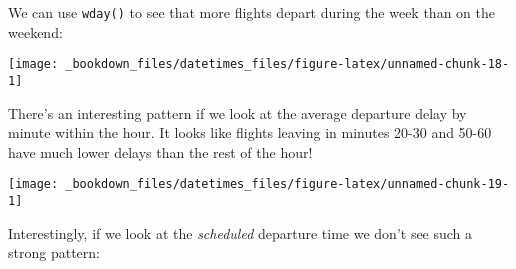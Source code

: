 \documentclass[]{book}
\newenvironment{Shaded}{\begin{snugshade}}{\end{snugshade}}
\newcommand{\KeywordTok}[1]{\textcolor[rgb]{0.13,0.29,0.53}{\textbf{{#1}}}}
\newcommand{\DataTypeTok}[1]{\textcolor[rgb]{0.13,0.29,0.53}{{#1}}}
\newcommand{\StringTok}[1]{\textcolor[rgb]{0.31,0.60,0.02}{{#1}}}
\newcommand{\OtherTok}[1]{\textcolor[rgb]{0.56,0.35,0.01}{{#1}}}
\newcommand{\NormalTok}[1]{{#1}}
\begin{document}
We can use \texttt{wday()} to see that more flights depart during the
week than on the weekend:

\begin{Shaded}
\end{Shaded}

\begin{center}\texttt{[image: \_bookdown\_files/datetimes\_files/figure-latex/unnamed-chunk-18-1]} \end{center}

There's an interesting pattern if we look at the average departure delay
by minute within the hour. It looks like flights leaving in minutes
20-30 and 50-60 have much lower delays than the rest of the hour!

\begin{Shaded}
\end{Shaded}

\begin{center}\texttt{[image: \_bookdown\_files/datetimes\_files/figure-latex/unnamed-chunk-19-1]} \end{center}

Interestingly, if we look at the \emph{scheduled} departure time we
don't see such a strong pattern:
\end{document}
